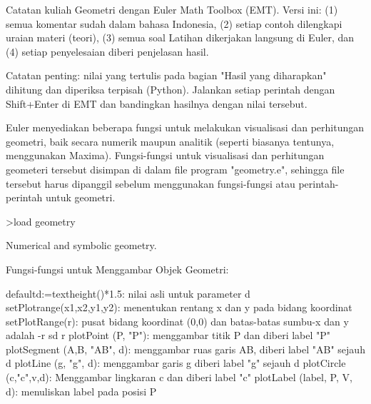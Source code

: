 \documentclass[a4paper,10pt]{article}
\begin{document}
\begin{eulernotebook}
\begin{eulercomment}
Catatan kuliah Geometri dengan Euler Math Toolbox (EMT).
Versi ini: (1) semua komentar sudah dalam bahasa Indonesia, (2) setiap contoh
dilengkapi uraian materi (teori), (3) semua soal Latihan dikerjakan langsung
di Euler, dan (4) setiap penyelesaian diberi penjelasan hasil.

Catatan penting: nilai yang tertulis pada bagian "Hasil yang diharapkan" dihitung
dan diperiksa terpisah (Python). Jalankan setiap perintah dengan Shift+Enter
di EMT dan bandingkan hasilnya dengan nilai tersebut.

Euler menyediakan beberapa fungsi untuk melakukan visualisasi dan perhitungan geometri, baik
secara numerik maupun analitik (seperti biasanya tentunya, menggunakan Maxima).
Fungsi-fungsi untuk visualisasi dan perhitungan geometeri tersebut disimpan di dalam file
program "geometry.e", sehingga file tersebut harus dipanggil sebelum menggunakan
fungsi-fungsi atau perintah-perintah untuk geometri.
\end{eulercomment}
\begin{eulerprompt}
>load geometry
\end{eulerprompt}
\begin{euleroutput}
  Numerical and symbolic geometry.
\end{euleroutput}
\begin{eulercomment}
\end{eulercomment}
\begin{eulercomment}
Fungsi-fungsi untuk Menggambar Objek Geometri:

\end{eulercomment}
\begin{eulerttcomment}
  defaultd:=textheight()*1.5: nilai asli untuk parameter d
  setPlotrange(x1,x2,y1,y2): menentukan rentang x dan y pada bidang koordinat
  setPlotRange(r): pusat bidang koordinat (0,0) dan batas-batas sumbu-x dan y adalah -r sd r
  plotPoint (P, "P"): menggambar titik P dan diberi label "P"
  plotSegment (A,B, "AB", d): menggambar ruas garis AB, diberi label "AB" sejauh d
  plotLine (g, "g", d): menggambar garis g diberi label "g" sejauh d
  plotCircle (c,"c",v,d): Menggambar lingkaran c dan diberi label "c"
  plotLabel (label, P, V, d): menuliskan label pada posisi P
\end{eulerttcomment}
\begin{eulercomment}


\end{eulercomment}
\end{eulernotebook}
\end{document}
